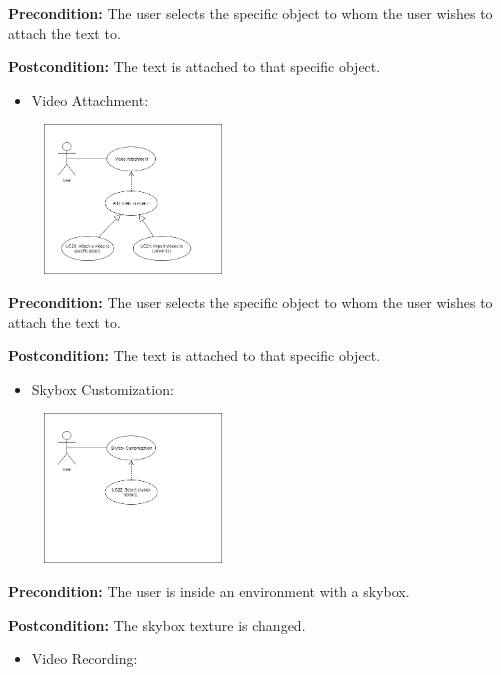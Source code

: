 \documentclass{article}
\begin{document}
\begin{flushleft}
	\textbf{Precondition:} The user selects the specific object to whom the user wishes to attach the text to.

	\textbf{Postcondition:} The text is attached to that specific object.

	\begin{itemize}
		\item Video Attachment:
	\end{itemize}

	\begin{center}
	\includegraphics[width=250px,height=150px]{VideoAttachment.png}
	\end{center}

	\textbf{Precondition:} The user selects the specific object to whom the user wishes to attach the text to.

	\textbf{Postcondition:} The text is attached to that specific object.

	\begin{itemize}
		\item Skybox Customization:
	\end{itemize}

	\begin{center}
	\includegraphics[width=250px,height=150px]{SkyboxCustomization.png}
	\end{center}

	\textbf{Precondition:} The user is inside an environment with a skybox.

	\textbf{Postcondition:} The skybox texture is changed.

	\begin{itemize}
		\item Video Recording:
	\end{itemize}


\end{flushleft}
\end{document}
